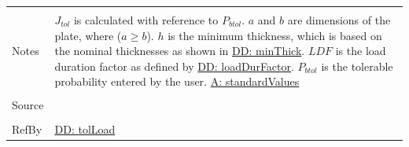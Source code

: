 \documentclass[12pt]{article}
\begin{document}
\begin{minipage}{\textwidth}
\begin{tabular}{>{\raggedright}p{}>{\raggedright\arraybackslash}p{}}
          \\ \midrule \\
          Notes & ${J_{tol}}$  is calculated with reference to  ${P_{btol}}$.
                  $a$ and $b$ are dimensions of the plate, where ($a\geq{}b$).
                  $h$ is the minimum thickness, which is based on the nominal thicknesses as shown in \hyperref[DD:minThick]{DD: minThick}.
                  $LDF$ is the load duration factor as defined by \hyperref[DD:loadDurFactor]{DD: loadDurFactor}.
                  ${P_{btol}}$ is the tolerable probability entered by the user.
                  \hyperref[assumpSV]{A: standardValues}
          \\ \midrule \\
          Source & \cite{astm2009}
          \\ \midrule \\
          RefBy & \hyperref[DD:tolLoad]{DD: tolLoad}
          \\ \bottomrule
          \end{tabular}
          \end{minipage}
\par~
\end{document}
